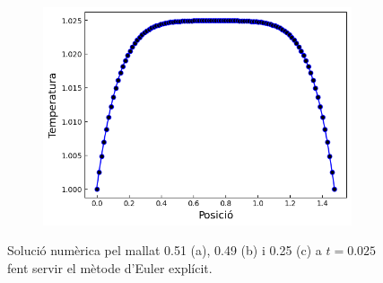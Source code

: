 \documentclass{article}
\begin{document}
\begin{figure}[h]
\begin{subfigure}[b]{0.32\textwidth}
        \includegraphics[width=\textwidth]{images/T_vs_z_at3.png}
        \caption{} 
        \label{fig:euler_exp_at2}
    \end{subfigure}
    \caption{Solució numèrica pel mallat 0.51 (a), 0.49 (b) i 0.25 (c) a $t=0.025$ fent servir el mètode d'Euler explícit.}
    \label{fig:euler_explicit}
\end{figure}
\end{document}
